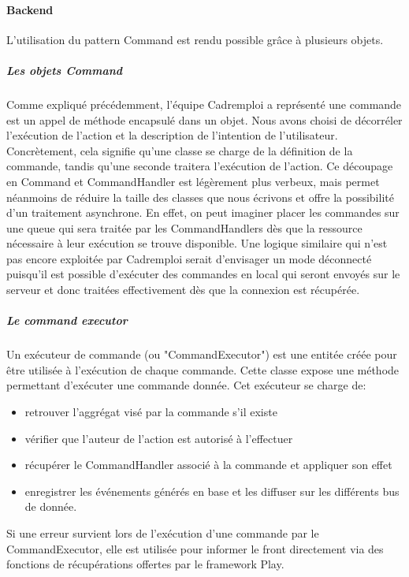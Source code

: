 \paragraph{Backend}
\label{par:Backend}
L'utilisation du pattern Command est rendu possible grâce à plusieurs objets.
\subparagraph{Les objets Command}
\label{subp:Les objets Command}
Comme expliqué précédemment, l'équipe Cadremploi a représenté une commande est un appel de méthode encapsulé dans un objet.
Nous avons choisi de décorréler l'exécution de l'action et la description de l'intention de l'utilisateur.
Concrètement, cela signifie qu'une classe se charge de la définition de la commande, tandis qu'une seconde traitera l'exécution de l'action.
Ce découpage en Command et CommandHandler est légèrement plus verbeux, mais permet néanmoins de réduire la taille des classes que nous écrivons et offre la possibilité d'un traitement asynchrone.
En effet, on peut imaginer placer les commandes sur une queue qui sera traitée par les CommandHandlers dès que la ressource nécessaire à leur exécution se trouve disponible.
Une logique similaire qui n'est pas encore exploitée par Cadremploi serait d'envisager un mode déconnecté puisqu'il est possible d'exécuter des commandes en local qui seront envoyés sur le serveur et donc traitées effectivement dès que la connexion est récupérée.
\subparagraph{Le command executor}
\label{subp:Le command executor}
Un exécuteur de commande (ou "CommandExecutor") est une entitée créée pour être utilisée à l'exécution de chaque commande.
Cette classe expose une méthode permettant d'exécuter une commande donnée.
Cet exécuteur se charge de:
\begin{itemize}
  \item retrouver l'aggrégat visé par la commande s'il existe
  \item vérifier que l'auteur de l'action est autorisé à l'effectuer
  \item récupérer le CommandHandler associé à la commande et appliquer son effet
  \item enregistrer les événements générés en base et les diffuser sur les différents bus de donnée.
\end{itemize}
Si une erreur survient lors de l'exécution d'une commande par le CommandExecutor, elle est utilisée pour informer le front directement via des fonctions de récupérations offertes par le framework Play.

